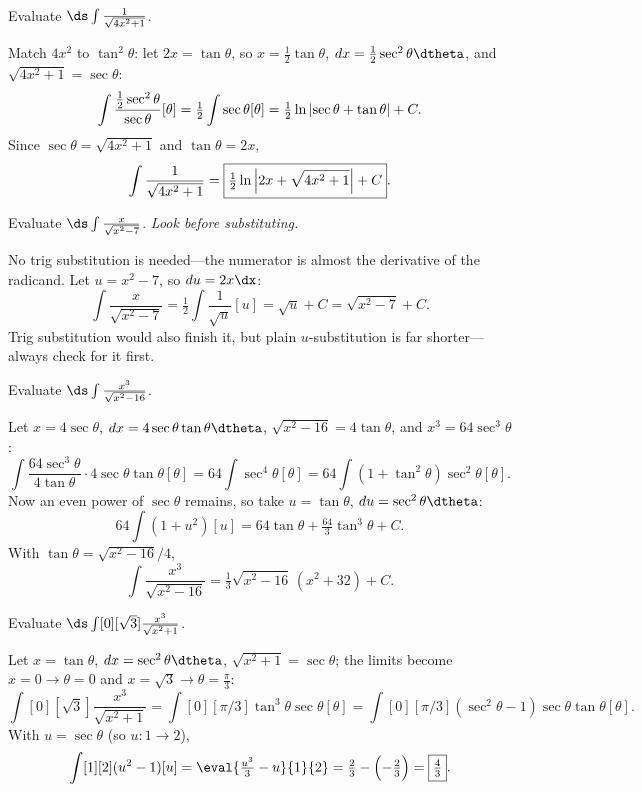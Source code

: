 \begin{exercise}
	Evaluate $\ds \int{\frac{1}{\sqrt{4x^2 + 1}}}$.
\end{exercise}
\begin{solution}[2in]
	Match $4x^2$ to $\tan^2\theta$: let $2x = \tan\theta$, so
	$x = \tfrac12\tan\theta$, $dx = \tfrac12\sec^2\theta\dtheta$, and
	$\sqrt{4x^2 + 1} = \sec\theta$:
	\[
		\int{\frac{\tfrac12\sec^2\theta}{\sec\theta}}[\theta]
		   = \tfrac12\int{\sec\theta}[\theta]
		   = \tfrac12\ln\left\lvert \sec\theta + \tan\theta \right\rvert + C.
	\]
	Since $\sec\theta = \sqrt{4x^2 + 1}$ and $\tan\theta = 2x$,
	\[
		\int{\frac{1}{\sqrt{4x^2 + 1}}}
		   = \boxed{\tfrac12\ln\left\lvert 2x + \sqrt{4x^2 + 1} \right\rvert + C}.
	\]
\end{solution}

\begin{exercise}
	Evaluate $\ds \int{\frac{x}{\sqrt{x^2 - 7}}}$. \emph{Look before substituting.}
\end{exercise}
\begin{solution}[1.5in]
	No trig substitution is needed---the numerator is almost the derivative of the
	radicand. Let $u = x^2 - 7$, so $du = 2x\dx$:
	\[
		\int{\frac{x}{\sqrt{x^2 - 7}}}
		   = \tfrac12\int{\frac{1}{\sqrt{u}}}[u]
		   = \sqrt{u} + C
		   = \boxed{\sqrt{x^2 - 7} + C}.
	\]
	Trig substitution would also finish it, but plain $u$-substitution is far
	shorter---always check for it first.
\end{solution}

\begin{exercise}
	Evaluate $\ds \int{\frac{x^3}{\sqrt{x^2 - 16}}}$.
\end{exercise}
\begin{solution}[2.75in]
	Let $x = 4\sec\theta$, $dx = 4\sec\theta\tan\theta\dtheta$,
	$\sqrt{x^2 - 16} = 4\tan\theta$, and $x^3 = 64\sec^3\theta$:
	\[
		\int{\frac{64\sec^3\theta}{4\tan\theta} \cdot 4\sec\theta\tan\theta}[\theta]
		   = 64\int{\sec^4\theta}[\theta]
		   = 64\int{(1 + \tan^2\theta)\sec^2\theta}[\theta].
	\]
	Now an even power of $\sec\theta$ remains, so take $u = \tan\theta$,
	$du = \sec^2\theta\dtheta$:
	\[
		64\int{(1 + u^2)}[u]
		   = 64\tan\theta + \tfrac{64}{3}\tan^3\theta + C.
	\]
	With $\tan\theta = \sqrt{x^2 - 16}/4$,
	\[
		\int{\frac{x^3}{\sqrt{x^2 - 16}}}
		   = \boxed{\tfrac13\sqrt{x^2 - 16}\,(x^2 + 32) + C}.
	\]
\end{solution}

\begin{exercise}
	Evaluate $\ds \int[0][\sqrt3]{\frac{x^3}{\sqrt{x^2 + 1}}}$.
\end{exercise}
\begin{solution}[2.5in]
	Let $x = \tan\theta$, $dx = \sec^2\theta\dtheta$, $\sqrt{x^2 + 1} = \sec\theta$;
	the limits become $x = 0 \to \theta = 0$ and
	$x = \sqrt3 \to \theta = \tfrac{\pi}{3}$:
	\[
		\int[0][\sqrt3]{\frac{x^3}{\sqrt{x^2 + 1}}}
		   = \int[0][\pi/3]{\tan^3\theta\sec\theta}[\theta]
		   = \int[0][\pi/3]{(\sec^2\theta - 1)\sec\theta\tan\theta}[\theta].
	\]
	With $u = \sec\theta$ (so $u : 1 \to 2$),
	\[
		\int[1][2]{(u^2 - 1)}[u]
		   = \eval{\tfrac{u^3}{3} - u}{1}{2}
		   = \tfrac23 - \Bigl(-\tfrac23\Bigr)
		   = \boxed{\tfrac43}.
	\]
\end{solution}

